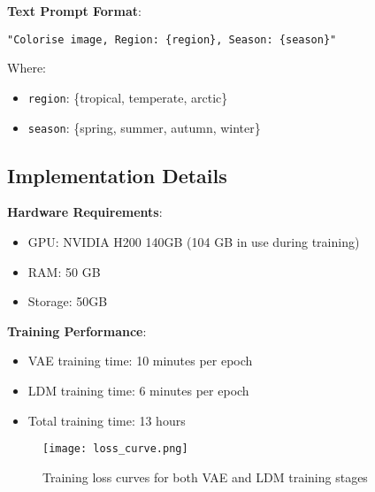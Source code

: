 \textbf{Text Prompt Format}:
\begin{center}
\texttt{"Colorise image, Region: \{region\}, Season: \{season\}"}
\end{center}

Where:
\begin{itemize}
    \item \texttt{region}: \{tropical, temperate, arctic\}
    \item \texttt{season}: \{spring, summer, autumn, winter\}
\end{itemize}

\subsection{Implementation Details}

\textbf{Hardware Requirements}:
\begin{itemize}
    \item GPU: NVIDIA H200 140GB (104 GB in use during training)
    \item RAM: 50 GB
    \item Storage: 50GB
\end{itemize}

\textbf{Training Performance}:
\begin{itemize}
    \item VAE training time: 10 minutes per epoch
    \item LDM training time: 6 minutes per epoch
    \item Total training time: 13 hours
\end{itemize}

\begin{figure}[h!]
    \centering
    \texttt{[image: loss\_curve.png]}
    \caption{Training loss curves for both VAE and LDM training stages}
    \label{fig:loss_curve}
\end{figure}